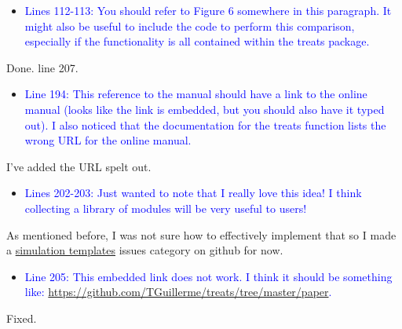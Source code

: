 \documentclass[
]{article}
\providecommand{\tightlist}{%
  \setlength{\itemsep}{0pt}\setlength{\parskip}{0pt}}
\begin{document}
\begin{itemize}
\tightlist
\item
  \textcolor{blue}{Lines 112-113: You should refer to Figure 6 somewhere in this
  paragraph. It might also be useful to include the code to perform this
  comparison, especially if the functionality is all contained within
  the treats package.}
\end{itemize}

Done. line 207.

\begin{itemize}
\tightlist
\item
  \textcolor{blue}{Line 194: This reference to the manual should have a link to the
  online manual (looks like the link is embedded, but you should also
  have it typed out). I also noticed that the documentation for the
  treats function lists the wrong URL for the online manual.}
\end{itemize}

I've added the URL spelt out.

\begin{itemize}
\tightlist
\item
  \textcolor{blue}{Lines 202-203: Just wanted to note that I really love this idea! I
  think collecting a library of modules will be very useful to users!}
\end{itemize}

As mentioned before, I was not sure how to effectively implement that so
I made a
\href{https://github.com/TGuillerme/treats/issues?q=is\%3Aopen+is\%3Aissue+label\%3A\%22simulation+template\%22}{simulation
templates} issues category on github for now.

\begin{itemize}
\tightlist
\item
  \textcolor{blue}{Line 205: This embedded link does not work. I think it should be
  something like:
  \url{https://github.com/TGuillerme/treats/tree/master/paper}.}
\end{itemize}

Fixed.
\end{document}
